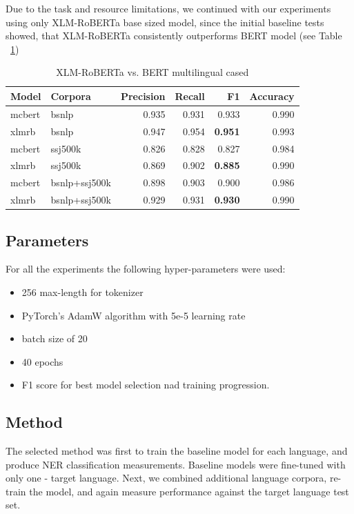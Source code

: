 \documentclass[sigconf]{acmart}
\begin{document}
Due to the task and resource limitations, we continued with our experiments using only XLM-RoBERTa base sized model,
since the initial baseline tests showed, that XLM-RoBERTa consistently outperforms BERT model (see Table ~\ref{tab:roberta_vs_bert})

\begin{table}[H]
  \caption{XLM-RoBERTa vs. BERT multilingual cased}
  \label{tab:roberta_vs_bert}
  \begin{tabular}{llrrrr}
    \toprule
    Model&Corpora&Precision&Recall&F1&Accuracy\\
    \midrule
    mcbert&bsnlp&0.935&0.931&0.933&0.990\\
    xlmrb&bsnlp&0.947&0.954&\textbf{0.951}&0.993\\
    \midrule
    mcbert&ssj500k&0.826&0.828&0.827&0.984\\
    xlmrb&ssj500k&0.869&0.902&\textbf{0.885}&0.990\\
    \midrule
    mcbert&bsnlp+ssj500k&0.898&0.903&0.900&0.986\\
    xlmrb&bsnlp+ssj500k&0.929&0.931&\textbf{0.930}&0.990\\
    \bottomrule
  \end{tabular}
\end{table}

\subsection{Parameters}
\label{subsec:parameters}
For all the experiments the following hyper-parameters were used:
\begin{itemize}
  \item 256 max-length for tokenizer
  \item PyTorch's AdamW algorithm with 5e-5 learning rate
  \item batch size of 20
  \item 40 epochs
  \item F1 score for best model selection nad training progression.
\end{itemize}

\subsection{Method}
\label{subsec:method}
The selected method was first to train the baseline model for each language, and produce NER classification measurements.
Baseline models were fine-tuned with only one - target language.
Next, we combined additional language corpora, re-train the model, and again measure performance against the target language test set.
\end{document}
